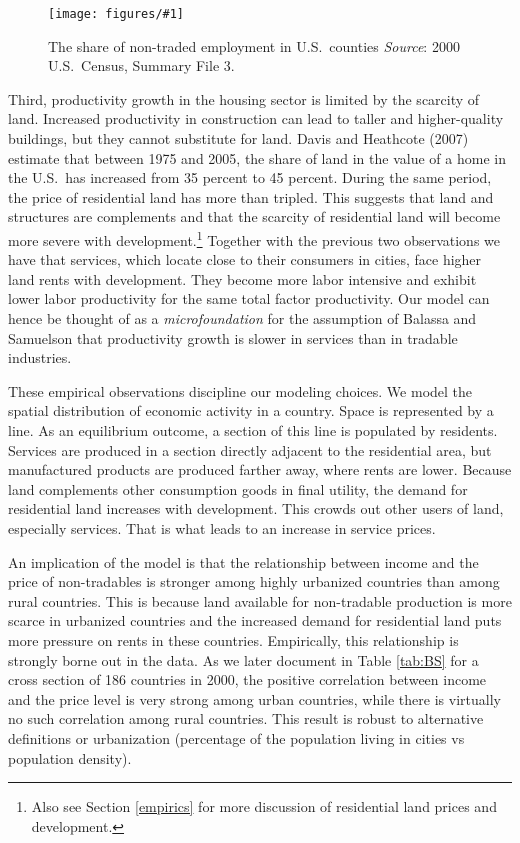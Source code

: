 \documentclass[12pt]{article}
\newcommand{\dofigure}[2]{\begin{figure}
\begin{centering}
\texttt{[image: figures/\#1]}
  \caption{#2\label{fig:#1}}
\end{centering}
\end{figure}}
\begin{document}
\dofigure{ntcounties}{The share of non-traded employment in U.S.~counties\newline
\small\emph{Source}: 2000 U.S.~Census, Summary File 3.}

Third, productivity growth in the housing sector is limited by the scarcity of land. Increased productivity in construction can lead to taller and higher-quality buildings, but they cannot substitute for land. Davis and Heathcote (2007) estimate that between 1975 and 2005, the share of land in the value of a home in the U.S.~has increased from 35 percent to 45 percent. During the same period, the price of residential land has more than tripled. This suggests that land and structures are complements and that the scarcity of residential land will become more severe with development.\footnote{Also see Section \ref{empirics} for more discussion of residential land prices and development.}
Together with the previous two observations we have that services, which locate close to their consumers in cities, face higher land rents with development. They become more labor intensive and exhibit lower labor productivity  for the same total factor productivity. Our model can hence be thought of as a \emph{microfoundation} for the assumption of Balassa and Samuelson that productivity growth is slower in services than in tradable industries.

These empirical observations discipline our modeling choices. We model the spatial distribution of economic activity in a country. Space is represented by a line. As an equilibrium outcome, a section of this line is populated by residents. Services are produced in a section directly adjacent to the residential area, but manufactured products are produced farther away, where rents are lower. Because land complements other consumption goods in final utility, the demand for residential land increases with development. This crowds out other users of land, especially services. That is what leads to an increase in service prices.

An implication of the model is that the relationship between income and the price of non-tradables is stronger among highly urbanized countries than among rural countries. This is because land available for non-tradable production is more scarce in urbanized countries and the increased demand for residential land puts more pressure on rents in these countries. Empirically, this relationship is strongly borne out in the data. As we later document in Table \ref{tab:BS} for a cross section of 186 countries in 2000, the positive correlation between income and the price level is very strong among urban countries, while there is virtually no such correlation among rural countries. This result is robust to alternative definitions or urbanization (percentage of the population living in cities vs population density).
\end{document}
